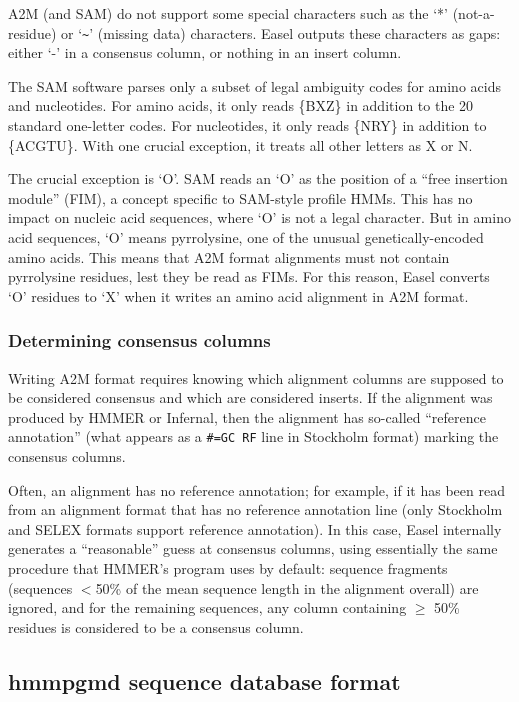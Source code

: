 A2M (and SAM) do not support some special characters such as the `*'
(not-a-residue) or `\verb+~+' (missing data) characters. Easel outputs these
characters as gaps: either `-' in a consensus column, or nothing in an
insert column.

The SAM software parses only a subset of legal ambiguity codes for
amino acids and nucleotides. For amino acids, it only reads \{BXZ\} in
addition to the 20 standard one-letter codes. For nucleotides, it only
reads \{NRY\} in addition to \{ACGTU\}. With one crucial exception, it
treats all other letters as X or N. 

The crucial exception is `O'. SAM reads an `O' as the position of a
``free insertion module'' (FIM), a concept specific to SAM-style
profile HMMs. This has no impact on nucleic acid sequences, where `O'
is not a legal character. But in amino acid sequences, `O' means
pyrrolysine, one of the unusual genetically-encoded amino acids.  This
means that A2M format alignments must not contain pyrrolysine
residues, lest they be read as FIMs. For this reason, Easel converts
`O' residues to `X' when it writes an amino acid alignment in A2M
format.

\subsubsection{Determining consensus columns}

Writing A2M format requires knowing which alignment columns are
supposed to be considered consensus and which are considered
inserts. If the alignment was produced by HMMER or Infernal, then the
alignment has so-called ``reference annotation'' (what appears as a
\verb+#=GC RF+ line in Stockholm format) marking the consensus
columns. 

Often, an alignment has no reference annotation; for example, if it
has been read from an alignment format that has no reference
annotation line (only Stockholm and SELEX formats support reference
annotation). In this case, Easel internally generates a ``reasonable''
guess at consensus columns, using essentially the same procedure that
HMMER's  program uses by default: sequence fragments
(sequences $<$50\% of the mean sequence length in the alignment
overall) are ignored, and for the remaining sequences, any column
containing $\geq$ 50\% residues is considered to be a consensus
column.




\subsection{hmmpgmd sequence database format}

